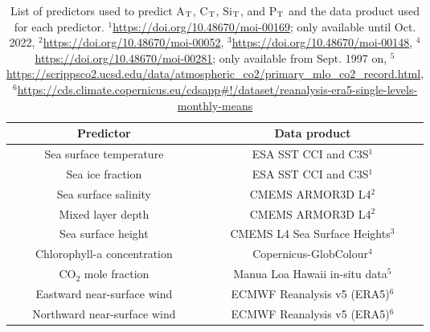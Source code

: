 \documentclass{article}
\begin{document}

	\begin{table}
		\centering
		\bgroup
		\def\arraystretch{1.5}
		\begin{tabular}{c|c}
			Predictor & Data product \\ \hline
			Sea surface temperature & ESA SST CCI and C3S$^1$  \\
			Sea ice fraction & ESA SST CCI and C3S$^1$  \\
			Sea surface salinity & CMEMS ARMOR3D L4$^2$ \\
			Mixed layer depth & CMEMS ARMOR3D L4$^2$ \\
			Sea surface height & CMEMS L4 Sea Surface Heights$^3$ \\
			Chlorophyll-a concentration & Copernicus-GlobColour$^4$ \\
			CO$_2$ mole fraction & Manua Loa Hawaii in-situ data$^5$ \\ %
			Eastward near-surface wind & ECMWF Reanalysis v5 (ERA5)$^6$ \\
			Northward near-surface wind & ECMWF Reanalysis v5 (ERA5)$^6$
		\end{tabular}
		\egroup
		\caption{List of predictors used to predict A$_\textup{T}$, C$_\textup{T}$, Si$_\textup{T}$, and P$_\textup{T}$ and the data product used for each predictor. $^1$\url{https://doi.org/10.48670/moi-00169}; only available until Oct. 2022, $^2$\url{https://doi.org/10.48670/moi-00052}, $^3$\url{https://doi.org/10.48670/moi-00148},
		$^4$\url{https://doi.org/10.48670/moi-00281}; only available from Sept. 1997 on, $^5$\url{https://scrippsco2.ucsd.edu/data/atmospheric_co2/primary_mlo_co2_record.html}, %
		$^6$\url{https://cds.climate.copernicus.eu/cdsapp\#!/dataset/reanalysis-era5-single-levels-monthly-means}}
		\label{tab:pred_data}
	\end{table}
	
\end{document}
